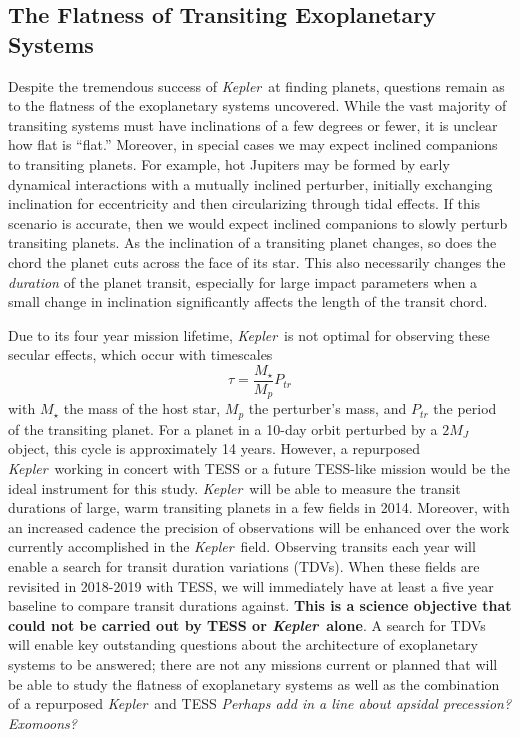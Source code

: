 \documentclass[12pt, preprint]{aastex}
\newcommand{\observatory}[1]{\textsl{#1}}
\newcommand{\kepler}{\observatory{Kepler}}
\newcommand{\Kepler}{\kepler}
\begin{document}
\subsection{The Flatness of Transiting Exoplanetary Systems}
Despite the tremendous success of \Kepler\ at finding planets, questions remain
 as to the flatness of the exoplanetary systems uncovered. 
While the vast majority of transiting systems must have inclinations of a 
 few degrees or fewer, it is unclear how flat is ``flat.'' 
Moreover, in special cases we may expect inclined companions to transiting 
 planets. 
For example, hot Jupiters may be formed by early dynamical interactions with a 
 mutually inclined perturber, initially exchanging inclination for eccentricity
 and then circularizing through tidal effects. 
If this scenario is accurate, then we would expect inclined companions to 
 slowly perturb transiting planets. 
As the inclination of a transiting planet changes, so does the chord the planet
 cuts across the face of its star. This also necessarily changes the 
 \emph{duration} of the planet transit, especially for large impact parameters
 when a small change in inclination significantly affects the length of the 
 transit chord.

Due to its four year mission lifetime, \Kepler\ is not optimal for observing 
 these secular effects, which occur with timescales 
\begin{equation}
\tau = \frac{M_\star}{M_p}P_{tr}
\end{equation}
with $M_\star$ the mass of the host star, $M_p$ the perturber's mass, and
 $P_{tr}$ the period of the transiting planet. 
For a planet in a 10-day orbit perturbed by a $2 M_J$ object, this cycle is 
 approximately 14 years. 
 However, a repurposed \Kepler\ working in concert with
 TESS or a future TESS-like mission would be the ideal instrument for this 
 study. 
\Kepler\ will be able to measure the transit durations of large, warm 
 transiting planets in a few fields in 2014. 
Moreover, with an increased cadence the precision of observations will be 
 enhanced over the work currently accomplished in the \Kepler\ field. 
Observing transits each year will enable a search for transit duration 
 variations (TDVs). 
When these fields are revisited in 2018-2019 with TESS, we will immediately have
 at least a five year baseline to compare transit durations against. 
\textbf{This is a science objective that could not be carried out by TESS or 
 \Kepler\ alone}. 
A search for TDVs will enable key outstanding questions about the architecture
 of exoplanetary systems to be answered;  there are not any missions current or
 planned that will be able to study the flatness of exoplanetary systems as 
 well as the combination of a repurposed \Kepler\ and TESS
\emph{Perhaps add in a line about apsidal precession? Exomoons?}
 
\end{document}
